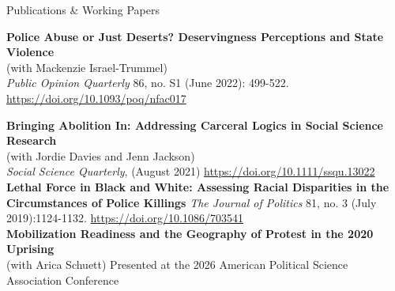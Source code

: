 \documentclass{resume} %
\begin{document}
\begin{rSection}{Publications \& Working Papers}

{\bf Police Abuse or Just Deserts? Deservingness Perceptions and State Violence} \\ (with Mackenzie Israel-Trummel) \\ \textit{Public Opinion Quarterly} 86, no. S1 (June 2022): 499-522. 
\href{https://doi.org/10.1093/poq/nfac017} {https://doi.org/10.1093/poq/nfac017}

{\bf Bringing Abolition In: 
Addressing Carceral Logics in Social Science Research
} \\(with Jordie Davies and Jenn Jackson) \\ \textit{Social Science Quarterly}, (August 2021) \href{https://doi.org/10.1111/ssqu.13022} {https://doi.org/10.1111/ssqu.13022}\\

{\bf Lethal Force in Black and White: Assessing Racial Disparities in the Circumstances of Police Killings} {\em The Journal of Politics} 81, no. 3 (July 2019):1124-1132. \href{https://doi.org/10.1086/703541}{https://doi.org/10.1086/703541}\\

{\bf Mobilization Readiness and the Geography of Protest in the 2020 Uprising} \\ (with Arica Schuett) Presented at the 2026 American Political Science Association Conference \\




\end{rSection}
\end{document}
